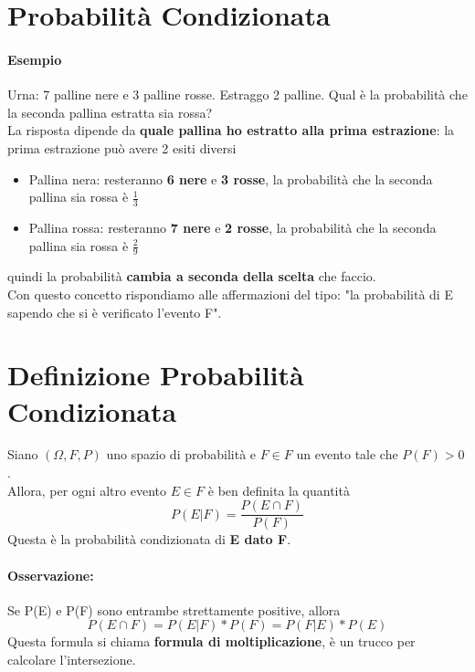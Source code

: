 \documentclass{report}
\begin{document}
\section{Probabilità Condizionata}
\paragraph{Esempio} Urna: 7 palline nere e 3 palline rosse. Estraggo 2 palline. Qual è la probabilità che la seconda pallina estratta sia rossa?\\
La risposta dipende da \textbf{quale pallina ho estratto alla prima estrazione}: la prima estrazione può avere 2 esiti diversi \begin{itemize}
    \item Pallina nera: resteranno \textbf{6 nere} e \textbf{3 rosse}, la probabilità che la seconda pallina sia rossa è \(\frac{1}{3}\)
    \item Pallina rossa: resteranno \textbf{7 nere} e \textbf{2 rosse}, la probabilità che la seconda pallina sia rossa è \(\frac{2}{9}\)
\end{itemize}
quindi la probabilità \textbf{cambia a seconda della scelta} che faccio.\\
Con questo concetto rispondiamo alle affermazioni del tipo: "la probabilità di E sapendo che si è verificato l'evento F".
\section{Definizione Probabilità Condizionata}
Siano \((\Omega, \textit{F}, P)\) uno spazio di probabilità e \(F \in \textit{F}\) un evento tale che \(P(F) > 0\).\\
Allora, per ogni altro evento \(E \in \textit{F}\) è ben definita la quantità \[P(E|F) = \frac{P(E \cap F)}{P(F)}\] Questa è la probabilità condizionata di \textbf{E dato F}.
\paragraph{Osservazione:} Se P(E) e P(F) sono entrambe strettamente positive, allora \[P(E \cap F) = P(E|F)*P(F) = P(F|E)*P(E)\] Questa formula si chiama \textbf{formula di moltiplicazione}, è un trucco per calcolare l'intersezione.
\end{document}

